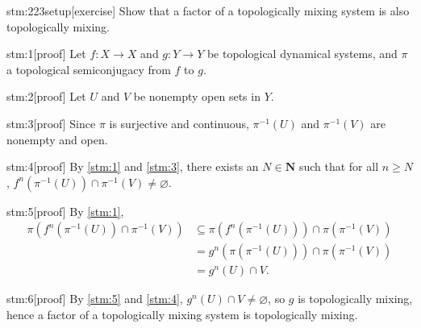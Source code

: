 
\begin{stm}{stm:223setup}[exercise]
Show that a factor of a topologically mixing system is also topologically mixing.
\end{stm}


\begin{stm}{stm:1}[proof]
Let $f : X \to X$ and $g : Y \to Y$ be topological dynamical systems, and $\pi$ a topological semiconjugacy from $f$ to $g$.
\end{stm}

\begin{stm}{stm:2}[proof]
Let $U$ and $V$ be nonempty open sets in $Y$.
\end{stm}

\begin{stm}{stm:3}[proof]
Since $\pi$ is surjective and continuous, $\pi^{-1}(U)$ and $\pi^{-1}(V)$ are nonempty and open.
\end{stm}

\begin{stm}{stm:4}[proof]
By \ref{stm:1} and \ref{stm:3}, there exists an $N \in \mathbf{N}$ such that for all $n \geq N$, $f^n(\pi^{-1}(U)) \cap \pi^{-1}(V) \neq \varnothing$.
\end{stm}

\begin{stm}{stm:5}[proof]
By \ref{stm:1}, 
\begin{align*}
\pi\left(f^n(\pi^{-1}(U)) \cap \pi^{-1}(V)\right) 
&\subseteq \pi(f^n(\pi^{-1}(U))) \cap \pi(\pi^{-1}(V)) \\
&= g^n(\pi(\pi^{-1}(U))) \cap \pi(\pi^{-1}(V)) \\
&= g^n(U) \cap V.
\end{align*}
\end{stm}

\begin{stm}{stm:6}[proof]
By \ref{stm:5} and \ref{stm:4}, $g^n(U) \cap V \neq \varnothing$, so $g$ is topologically mixing, hence a factor of a topologically mixing system is topologically mixing.
\end{stm}
